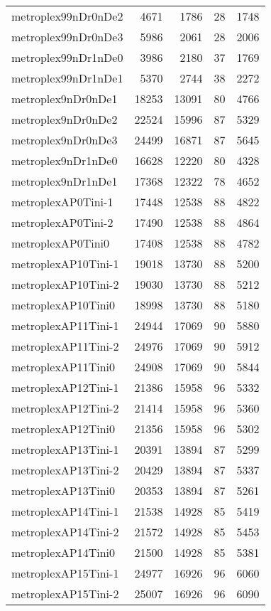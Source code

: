 \begin{longtable}{lrrrr}
metroplex99nDr0nDe2 & 4671 & 1786 & 28 & 1748 \\
metroplex99nDr0nDe3 & 5986 & 2061 & 28 & 2006 \\
metroplex99nDr1nDe0 & 3986 & 2180 & 37 & 1769 \\
metroplex99nDr1nDe1 & 5370 & 2744 & 38 & 2272 \\
metroplex9nDr0nDe1 & 18253 & 13091 & 80 & 4766 \\
metroplex9nDr0nDe2 & 22524 & 15996 & 87 & 5329 \\
metroplex9nDr0nDe3 & 24499 & 16871 & 87 & 5645 \\
metroplex9nDr1nDe0 & 16628 & 12220 & 80 & 4328 \\
metroplex9nDr1nDe1 & 17368 & 12322 & 78 & 4652 \\
metroplexAP0Tini-1 & 17448 & 12538 & 88 & 4822 \\
metroplexAP0Tini-2 & 17490 & 12538 & 88 & 4864 \\
metroplexAP0Tini0 & 17408 & 12538 & 88 & 4782 \\
metroplexAP10Tini-1 & 19018 & 13730 & 88 & 5200 \\
metroplexAP10Tini-2 & 19030 & 13730 & 88 & 5212 \\
metroplexAP10Tini0 & 18998 & 13730 & 88 & 5180 \\
metroplexAP11Tini-1 & 24944 & 17069 & 90 & 5880 \\
metroplexAP11Tini-2 & 24976 & 17069 & 90 & 5912 \\
metroplexAP11Tini0 & 24908 & 17069 & 90 & 5844 \\
metroplexAP12Tini-1 & 21386 & 15958 & 96 & 5332 \\
metroplexAP12Tini-2 & 21414 & 15958 & 96 & 5360 \\
metroplexAP12Tini0 & 21356 & 15958 & 96 & 5302 \\
metroplexAP13Tini-1 & 20391 & 13894 & 87 & 5299 \\
metroplexAP13Tini-2 & 20429 & 13894 & 87 & 5337 \\
metroplexAP13Tini0 & 20353 & 13894 & 87 & 5261 \\
metroplexAP14Tini-1 & 21538 & 14928 & 85 & 5419 \\
metroplexAP14Tini-2 & 21572 & 14928 & 85 & 5453 \\
metroplexAP14Tini0 & 21500 & 14928 & 85 & 5381 \\
metroplexAP15Tini-1 & 24977 & 16926 & 96 & 6060 \\
metroplexAP15Tini-2 & 25007 & 16926 & 96 & 6090 \\

\end{longtable}
